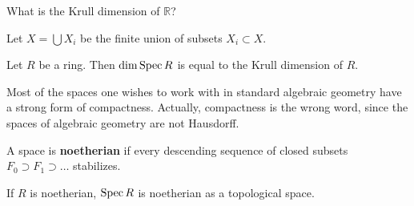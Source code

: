 \begin{exercise} 
What is the Krull dimension of $\mathbb{R}$?
\end{exercise} 

\begin{exercise} 
Let $X = \bigcup X_i$ be the finite union of subsets $X_i \subset X$. 

\end{exercise} 

\begin{exercise} 
Let $R$ be a ring. Then $\dim \operatorname{Spec} R$ is equal to the Krull dimension of $R$. 
\end{exercise} 

Most of the spaces one wishes to work with in standard algebraic geometry have a
strong form of compactness. Actually, compactness is the wrong word, since the
spaces of algebraic geometry are not Hausdorff.

\begin{definition} 
A space is \textbf{noetherian} if every descending sequence of closed subsets
$F_0 \supset F_1 \supset \dots$ stabilizes.
\end{definition} 

\begin{exercise} 
If $R$ is noetherian, $\operatorname{Spec} R$ is noetherian as a topological space.
\end{exercise} 


